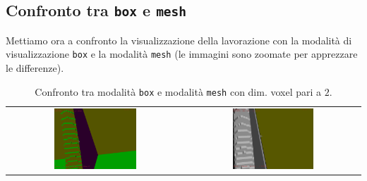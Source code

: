 \subsection{Confronto tra \texttt{box} e \texttt{mesh}}
Mettiamo ora a confronto la visualizzazione della lavorazione con la modalità di visualizzazione \texttt{box} e la modalità \texttt{mesh} (le immagini sono zoomate per apprezzare le differenze).
\begin{center}
\begin{table}[hbtp]
  \begin{tabular}{cc}
   \includegraphics[width=0.48\textwidth]{img/screenshots/pos2_box_v2_2.png} &%
   \includegraphics[width=0.48\textwidth]{img/screenshots/pos2_mesh_v2_2.png}\\
  \end{tabular}
  \caption{Confronto tra modalità \texttt{box} e modalità \texttt{mesh} con dim. voxel pari a $2$.}
  \label{tab:confrontobm1}
\end{table}
\end{center}

